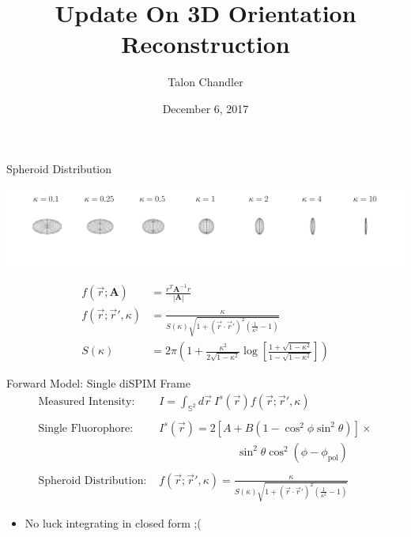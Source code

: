\documentclass[presentation]{beamer}
\author{Talon Chandler}
\date{December 6, 2017}
\title{Update On 3D Orientation Reconstruction}
\begin{document}
\maketitle
\begin{frame}[label=sec-1]{Spheroid Distribution}
\vspace{-1em}
\begin{center}
  \includegraphics[width=1.0\textwidth, interpolate=true]{figs/spheroid.pdf}
\end{center}
\vspace{-4em}
\begin{align*}
  f(\vec{r}; \mathbf{A}) &= \frac{r^T\mathbf{A}^{-1}r}{|\mathbf{A}|}\\
  f(\vec{r}; \vec{r}', \kappa) &= \frac{\kappa}{S(\kappa)\sqrt{1+(\vec{r}\cdot\vec{r}')^2\left(\frac{1}{\kappa^2} - 1\right)}}\\
  S(\kappa) &= 2\pi\left(1 + \frac{\kappa^2}{2\sqrt{1-\kappa^2}}\log\left[\frac{1+\sqrt{1-\kappa^2}}{1-\sqrt{1-\kappa^2}}\right]\right)
\end{align*}
\vspace{-1em}
\begin{itemize}
\end{itemize}
\end{frame}
\begin{frame}[label=sec-2]{Forward Model: Single diSPIM Frame}
\begin{align*}
  \text{Measured Intensity:   }& I = \int_{\mathbb{S}^2}d\vec{r}\ I^s(\vec{r})f(\vec{r}; \vec{r}', \kappa)\\ \\
  \text{Single Fluorophore:   }& I^s(\vec{r}) = 2[A+B(1 - \cos^2\phi\sin^2\theta)]\times \\ & \hspace{7em}\sin^2\theta\cos^2(\phi - \phi_{\text{pol}})\\ \\
  \text{Spheroid Distribution:   }& f(\vec{r}; \vec{r}', \kappa) = \frac{\kappa}{S(\kappa)\sqrt{1+(\vec{r}\cdot\vec{r}')^2\left(\frac{1}{\kappa^2} - 1\right)}}
\end{align*}
\begin{itemize}
\item No luck integrating in closed form ;(
\end{itemize}
\end{frame}
\end{document}
